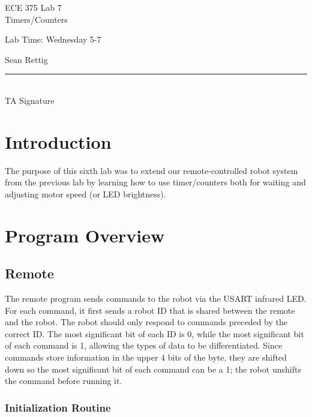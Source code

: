 \documentclass[12pt,letterpaper]{article}
\begin{document}
\begin{titlepage}
    \vspace*{4cm}
    \begin{flushright}
    {\huge
        ECE 375 Lab 7\\[1cm]
    }
    {\large
        Timers/Counters
    }
    \end{flushright}
    \begin{flushleft}
    Lab Time: Wednesday 5-7
    \end{flushleft}
    \begin{flushright}
    Sean Rettig
    \vfill
    \rule{5in}{.5mm}\\
    TA Signature
    \end{flushright}

\end{titlepage}

\section{Introduction}

The purpose of this sixth lab was to extend our remote-controlled robot system
from the previous lab by learning how to use timer/counters both for waiting
and adjusting motor speed (or LED brightness).

\section{Program Overview}

\subsection{Remote}

The remote program sends commands to the robot via the USART infrared LED.  For
each command, it first sends a robot ID that is shared between the remote and
the robot.  The robot should only respond to commands preceded by the correct
ID.  The most significant bit of each ID is 0, while the most significant bit
of each command is 1, allowing the types of data to be differentiated.  Since
commands store information in the upper 4 bits of the byte, they are shifted
down so the most significant bit of each command can be a 1; the robot unshifts
the command before running it.

\subsubsection{Initialization Routine}
\end{document}
